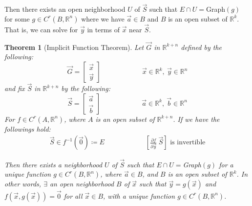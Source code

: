 \documentclass[15pt]{book}
\theoremstyle{break}
\theoremstyle{break}
\newtheorem{thm}{Theorem}[section]
\newcommand{\R}{\mathbb{R}}
\begin{document}
Then there exists an open neighborhood $U$ of $\vec{S}$ such that $E \cap U = $Graph$(g)$ for some $g \in C^r(B,\R^n)$ where we have $\vec{a}\in B$ and $B$ is an open subset of $\R^k$. That is, we can solve for $\vec{y}$ in terms of $\vec{x}$ near $\vec{S}$. \\

\begin{thm}[Implicit Function Theorem]
Let $\vec{G}$ in $\R^{k+n}$ defined by the following:
$$\vec{G} = \begin{bmatrix}
\vec{x} \\ \vec{y}
\end{bmatrix}\qquad\qquad\qquad\vec{x}\in \R^k,\ \vec{y}\in \R^n
$$
and fix $\vec{S}$ in $\R^{k+n}$ by the following:
$$\vec{S} = \begin{bmatrix}
\vec{a} \\ \vec{b}
\end{bmatrix}\qquad\qquad\qquad\vec{a}\in \R^k,\ \vec{b}\in \R^n
$$
For $f \in C^r(A,\R^n)$, where $A$ is an open subset of $\R^{k+n}$. If we have the followings hold:
\begin{align*}
\vec{S} \in f^{-1}(\vec{0}) \coloneqq E \qquad\qquad\qquad \left[\frac{\partial f}{\partial \vec{y}}\ \vec{S}\right] \text{ is invertible}
\end{align*}

Then there exists a neighborhood $U$ of $\vec{S}$ such that $E \cap U = $Graph$(g)$ for a unique function $g \in C^r(B,\R^n)$, where $\vec{a}\in B$, and $B$ is an open subset of $\R^k$. In other words, $\exists$ an open neighborhood $B$ of $\vec{x}$ such that $\vec{y} = g(\vec{x})$ and $f(\vec{x},g(\vec{x})) = \vec{0}$ for all $\vec{x}\in B$, with a unique function $g \in C^r(B,\R^n)$.
\end{thm}
\end{document}
